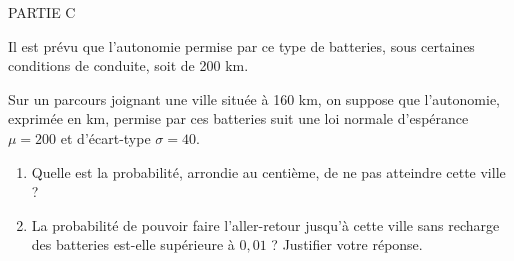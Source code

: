 \begin{h3}
PARTIE C\end{h3}
Il est prévu que l'autonomie permise par ce type de batteries, sous certaines conditions de conduite, soit de 200 km.
\par
Sur un parcours joignant une ville située à 160 km, on suppose que l'autonomie, exprimée en km, permise par ces batteries suit une loi normale d'espérance $\mu =200$ et d'écart-type $\sigma =40$.
\begin{enumerate}
     \item
     Quelle est la probabilité, arrondie au centième, de ne pas atteindre cette ville ?
     \item
     La probabilité de pouvoir faire l'aller-retour jusqu'à cette ville sans recharge des batteries est-elle supérieure à $0,01$ ? Justifier votre réponse.
\end{enumerate}
